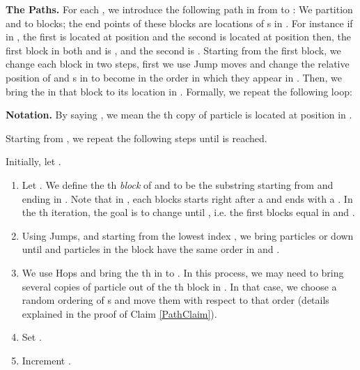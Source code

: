 \documentclass[10 pt]{article}
\begin{document}
\textbf{The Paths.}
For each , we introduce the following path in  from  to : We partition 
and  to  blocks; the end points of these blocks are locations of s in . For instance if in , the first 
is located at position  and the second  is located at position  then, the first block in both  and  is ,
and the second is . Starting from the first block, we change each block in two steps, first we use Jump moves and change
the relative position of  and s in  to become in the order in which they appear in . Then, we bring the 
in that block to its location in . Formally, we repeat the following loop:
\medskip

\textbf{Notation.} By saying , we mean the th copy of particle  is located at position  in . 

\noindent 
Starting from , we repeat the following steps until  is reached.

Initially, let . 
\begin{enumerate}
\item Let . We define the  th \emph{block} of  and  to be the substring starting from  and ending in .
Note that in , each blocks starts right after a  and ends with a . In the th iteration, the goal is to change
 until , i.e. the first  blocks equal in  and .

\item Using Jumps, and starting from the lowest index , we bring particles  or  down until  and  particles in the block
 have the same order in  and .
\item We use Hops and bring the th  in  to . In this process, we may need to bring several copies of particle
 out of the th block in . In that case, we choose a random ordering of s and move them with respect to that order
(details explained in the proof of Claim \ref{PathClaim}).
\item Set .
\item Increment .
\end{enumerate}
\end{document}
